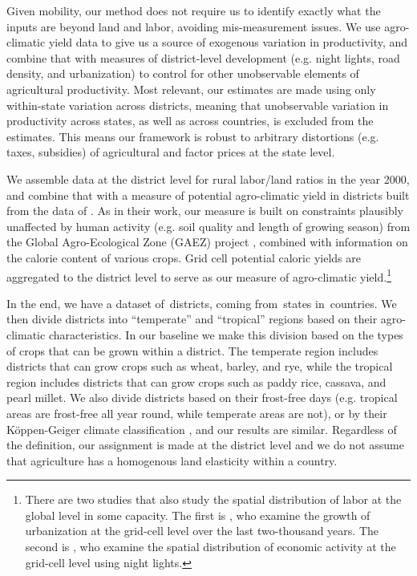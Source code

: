 \documentclass[11pt]{article}
\begin{document}
Given mobility, our method does not require us to identify exactly what the inputs are beyond land and labor, avoiding mis-measurement issues. We use agro-climatic yield data to give us a source of exogenous variation in productivity, and combine that with measures of district-level development (e.g. night lights, road density, and urbanization) to control for other unobservable elements of agricultural productivity. Most relevant, our estimates are made using only within-state variation across districts, meaning that unobservable variation in productivity across states, as well as across countries, is excluded from the estimates. This means our framework is robust to arbitrary distortions (e.g. taxes, subsidies) of agricultural and factor prices at the state level.

We assemble data at the district level for rural labor/land ratios in the year 2000, and combine that with a measure of potential agro-climatic yield in districts built from the data of \citet{galorozak2016}. As in their work, our measure is built on constraints plausibly unaffected by human activity (e.g. soil quality and length of growing season) from the Global Agro-Ecological Zone (GAEZ) project \citep{gaez}, combined with information on the calorie content of various crops. Grid cell potential caloric yields are aggregated to the district level to serve as our measure of agro-climatic yield.\footnote{There are two studies that also study the spatial distribution of labor at the global level in some capacity. The first is \citet{mfm2014}, who examine the growth of urbanization at the grid-cell level over the last two-thousand years. The second is \citet{hssw2016}, who examine the spatial distribution of economic activity at the grid-cell level using night lights.}

In the end, we have a dataset of\districts \ districts, coming from\provinces \ states in\countries \ countries. We then divide districts into ``temperate'' and ``tropical'' regions based on their agro-climatic characteristics. In our baseline we make this division based on the types of crops that can be grown within a district. The temperate region includes districts that can grow crops such as wheat, barley, and rye, while the tropical region includes districts that can grow crops such as paddy rice, cassava, and pearl millet. We also divide districts based on their frost-free days (e.g. tropical areas are frost-free all year round, while temperate areas are not), or by their K{\"o}ppen-Geiger climate classification \citep{kottek2006}, and our results are similar. Regardless of the definition, our assignment is made at the district level and we do not assume that agriculture has a homogenous land elasticity within a country. 
\end{document}
